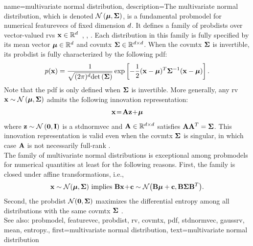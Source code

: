 	
{name={multivariate normal distribution}, 
	description={The multivariate normal distribution, 
 		which is denoted $\mathcal{N}\left({\bm \mu},{\bf \Sigma}\right)$, is a fundamental \gls{probmodel} 
 		for numerical \glspl{featurevec} of fixed dimension $d$. 
 		It defines a family of \glspl{probdist} over vector-valued \glspl{rv} 
 		${\bf x} \in \mathbb{R}^{d}$~\cite{BertsekasProb}, \cite{GrayProbBook}, \cite{Lapidoth09}. 
 		Each distribution in this family is fully specified by its \gls{mean} vector 
 		${\bm \mu} \in \mathbb{R}^{d}$ and \gls{covmtx} ${\bf \Sigma} \in \mathbb{R}^{d \times d}$. 
 		When the \gls{covmtx} ${\bf \Sigma}$ is invertible, its \gls{probdist} is 
 		fully characterized by the following \gls{pdf}:
 		\[
 		p({\bf x}) = 
 		\frac{1}{\sqrt{(2\pi)^{d} {\rm det}\left( {\bf \Sigma} \right)}} 
 		\exp\left[ -\frac{1}{2} 
 		({\bf x} - {\bm \mu})^T {\bf \Sigma}^{-1} 
 		({\bf x} - {\bm \mu}) \right].
 		\]
 		Note that the \gls{pdf} is only defined when ${\bf \Sigma}$ is invertible.
     		More generally, any \gls{rv} ${\bf x} \sim \mathcal{N}\left({\bm \mu},{\bf \Sigma}\right)$ 
     		admits the following innovation representation:
		\[{\bf x} \!=\! {\bf A} {\bf z} \!+\!{\bm \mu}
		\]
		where ${\bf z} \sim \mathcal{N}\left(\mathbf{0},\mathbf{I}\right)$ is a \gls{stdnormvec} 
		and ${\bf A} \in \mathbb{R}^{d \times d}$ satisfies ${\bf A} {\bf A}^T = {\bf \Sigma}$. 
		This innovation representation is valid even when the \gls{covmtx} ${\bf \Sigma}$ is singular, 
		in which case ${\bf A}$ is not necessarily full-rank \cite[Ch. 23]{Lapidoth2017}.\\ 
		The family of multivariate normal distributions is exceptional among \glspl{probmodel} for numerical 
		quantities at least for the following reasons. First, the family is closed under affine transformations, i.e., 
		\[ 
		{\bf x} \sim \mathcal{N}({\bm \mu},{\bf \Sigma}) \mbox{ implies } 
		{\bf B}{\bf x}\!+\!{\bf c} \sim \mathcal{N}\big( {\bf B}{\bm \mu}+{\bf c},{\bf B} {\bf \Sigma} {\bf B}^{T} \big). 
		\]
		Second, the \gls{probdist} $\mathcal{N}(\mathbf{0},{\bf \Sigma})$ maximizes the differential \gls{entropy} 
		among all distributions with the same \gls{covmtx} ${\bf \Sigma}$ \cite{coverthomas}. 
		\\ 
		See also: \gls{probmodel}, \gls{featurevec}, \gls{probdist}, \gls{rv}, \gls{covmtx}, \gls{pdf}, \gls{stdnormvec}, \gls{gaussrv}, \gls{mean}, \gls{entropy}.}, 
	first={multivariate normal distribution},
	text={multivariate normal distribution}
}

